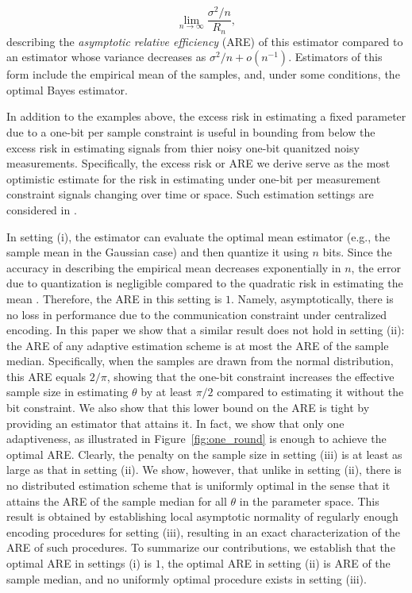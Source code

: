 \begin{equation}
\label{eq:ARE_def}
\lim_{n\to \infty} \frac{\sigma^2/n}{R_n},
\end{equation}
describing the \emph{asymptotic relative efficiency} (ARE) of this estimator compared to an estimator whose variance decreases as $\sigma^2/n+o(n^{-1})$. Estimators of this form include the empirical mean of the samples, and, under some conditions, the optimal Bayes estimator. \par
%
In addition to the examples above, the excess risk in estimating a fixed parameter due to a one-bit per sample constraint is useful in bounding from below the excess risk in estimating signals from thier noisy one-bit quanitzed noisy measurements. Specifically, the excess risk or ARE we derive serve as the most optimistic estimate for the risk in estimating under one-bit per measurement constraint signals changing over time or space. Such estimation settings are considered in \cite{baraniuk2017exponential, jacques2013robust, plan2013one, li2017channel, choi2016near}. \par


In setting (i), the estimator can evaluate the optimal mean estimator (e.g., the sample mean in the Gaussian case) and then quantize it using $n$ bits. Since the accuracy in describing the empirical mean decreases exponentially in $n$, the error due to quantization is negligible compared to the quadratic risk in estimating the mean \cite{720540}. Therefore, the ARE in this setting is $1$. Namely, asymptotically, there is no loss in performance due to the communication constraint under centralized encoding. 
%
In this paper we show that a similar result does not hold in setting (ii): the ARE of any adaptive estimation scheme is at most the ARE of the sample median. Specifically, when the samples are drawn from the normal distribution, this ARE equals $2/\pi$, showing that the one-bit constraint increases the effective sample size in estimating $\theta$ by at least $\pi/2$ compared to estimating it without the bit constraint. We also show that this lower bound on the ARE is tight by providing an estimator that attains it. In fact, we show that only one adaptiveness, as illustrated in Figure~\ref{fig:one_round} is enough to achieve the optimal ARE. 
%
Clearly, the penalty on the sample size in setting (iii) is at least as large as that in setting (ii). We show, however, that unlike in setting (ii), there is no distributed estimation scheme that is uniformly optimal in the sense that it attains the ARE of the sample median for all $\theta$ in the parameter space. This result is obtained by establishing local asymptotic normality of regularly enough encoding procedures for setting (iii), resulting in an exact characterization of the ARE of such procedures. To summarize our contributions, we establish that the optimal ARE in settings (i) is $1$, the optimal ARE in setting (ii) is ARE of the sample median, and no uniformly optimal procedure exists in setting (iii). 

